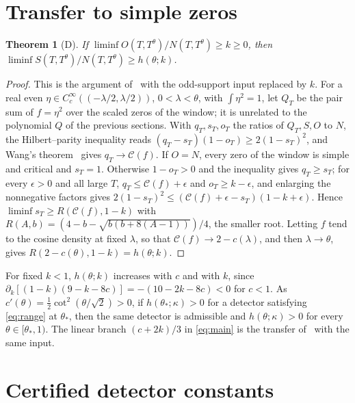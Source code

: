 \documentclass[11pt]{article}
\newtheorem{theorem}{Theorem}[section]
\theoremstyle{remark}
\begin{document}
\section{Transfer to simple zeros}\label{sec:transfer}

\begin{theorem}[D]\label{thm:transfer}
If $\liminf O(T,T^\theta)/N(T,T^\theta)\ge k\ge0$, then
$\liminf S(T,T^\theta)/N(T,T^\theta)\ge h(\theta;k)$.
\end{theorem}

\begin{proof}
This is the argument of~\cite[proof of Theorem 1.2]{CAOSShort} with the
odd-support input replaced by $k$. For a real even $\eta\in
C_c^\infty((-\lambda/2,\lambda/2))$, $0<\lambda<\theta$, with $\int\eta^2=1$,
let $Q_T$ be the pair sum of $f=\eta^2$ over the scaled zeros of the window;
it is unrelated to the polynomial $Q$ of the previous sections. With
$q_T,s_T,o_T$ the ratios of $Q_T,S,O$ to $N$, the Hilbert--parity inequality
\cite[Proposition 2.5]{CAOSShort} reads $(q_T-s_T)(1-o_T)\ge2(1-s_T)^2$, and
Wang's theorem~\cite[Theorem 2.2]{WangShort} gives $q_T\to\mathcal C(f)$. If
$O=N$, every zero of the window is simple and critical and $s_T=1$. Otherwise
$1-o_T>0$ and the inequality gives $q_T\ge s_T$; for every $\epsilon>0$ and all
large $T$, $q_T\le\mathcal C(f)+\epsilon$ and $o_T\ge k-\epsilon$, and enlarging
the nonnegative factors gives
$2(1-s_T)^2\le(\mathcal C(f)+\epsilon-s_T)(1-k+\epsilon)$. Hence
$\liminf s_T\ge R(\mathcal C(f),1-k)$ with
$R(A,b)=(4-b-\sqrt{b(b+8(A-1))})/4$, the smaller root. Letting $f$ tend to the
cosine density at fixed $\lambda$, so that $\mathcal C(f)\to2-c(\lambda)$, and
then $\lambda\to\theta$, gives $R(2-c(\theta),1-k)=h(\theta;k)$.
\end{proof}

For fixed $k<1$, $h(\theta;k)$ increases with $c$ and with $k$, since
$\partial_k[(1-k)(9-k-8c)]=-(10-2k-8c)<0$ for $c<1$. As
$c'(\theta)=\frac12\cot^2(\theta/\sqrt2)>0$, if $h(\theta_*;\kappa)>0$ for a
detector satisfying \eqref{eq:range} at $\theta_*$, then the same detector is admissible and
$h(\theta;\kappa)>0$ for every $\theta\in[\theta_*,1)$. The linear branch
$(c+2k)/3$ in \eqref{eq:main} is the transfer of~\cite[Theorem 1.4]{CAOSShort}
with the same input.

\section{Certified detector constants}\label{sec:certify}
\end{document}
